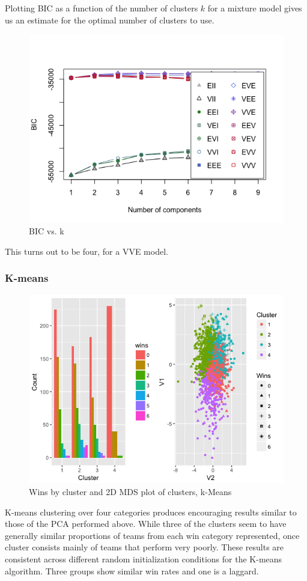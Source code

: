 \documentclass[10pt,a4paper, hidelinks]{article} %
\begin{document}
Plotting BIC as a function of the number of clusters $k$ for a mixture model gives us an estimate for the optimal number of clusters to use.

\begin{figure}[H]
	\centering
	\includegraphics[width=0.7\linewidth]{../fig/sonofaBIC}
	\caption{BIC vs. k}
\end{figure}

This turns out to be four, for a VVE model.

\subsubsection{K-means}

\begin{figure}[H]
	\centering
	\includegraphics[width=0.5\linewidth]{../fig/clusterfun}
			\caption{Wins by cluster and 2D MDS plot of clusters, k-Means}
\end{figure}

K-means clustering over four categories produces encouraging results similar to those of the PCA performed above. While three of the clusters seem to have generally similar proportions of teams from each win category represented, once cluster consists mainly of teams that perform very poorly.  These results are consistent across different random initialization conditions for the K-means algorithm. Three groups show similar win rates and one is a laggard.
\end{document}
